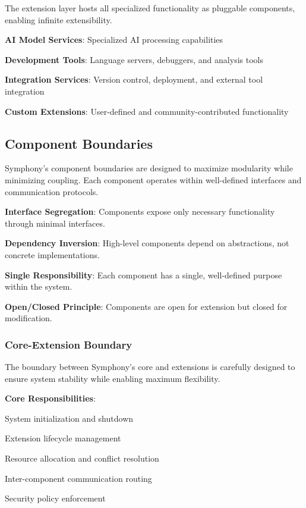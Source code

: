 The extension layer hosts all specialized functionality as pluggable components, enabling infinite extensibility.

\begin{compactlist}
    \item \textbf{AI Model Services}: Specialized AI processing capabilities
    \item \textbf{Development Tools}: Language servers, debuggers, and analysis tools
    \item \textbf{Integration Services}: Version control, deployment, and external tool integration
    \item \textbf{Custom Extensions}: User-defined and community-contributed functionality
\end{compactlist}

\subsection*{Component Boundaries}

Symphony's component boundaries are designed to maximize modularity while minimizing coupling. Each component operates within well-defined interfaces and communication protocols.

\begin{infobox}[title=Boundary Design Principles]
\textbf{Interface Segregation}: Components expose only necessary functionality through minimal interfaces.

\textbf{Dependency Inversion}: High-level components depend on abstractions, not concrete implementations.

\textbf{Single Responsibility}: Each component has a single, well-defined purpose within the system.

\textbf{Open/Closed Principle}: Components are open for extension but closed for modification.
\end{infobox}

\subsubsection*{Core-Extension Boundary}

The boundary between Symphony's core and extensions is carefully designed to ensure system stability while enabling maximum flexibility.

\textbf{Core Responsibilities}:
\begin{compactlist}
    \item System initialization and shutdown
    \item Extension lifecycle management
    \item Resource allocation and conflict resolution
    \item Inter-component communication routing
    \item Security policy enforcement
\end{compactlist}


